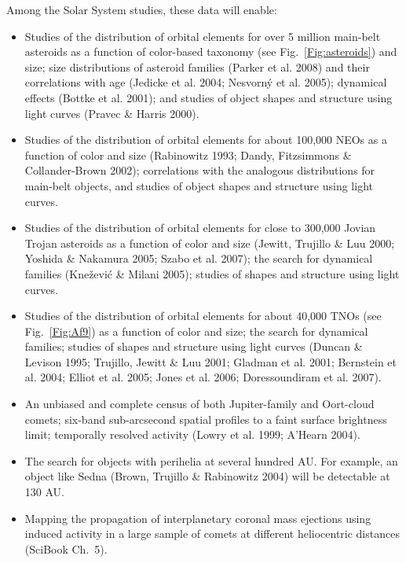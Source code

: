 \documentclass{emulateapj}
\begin{document}
Among the Solar System studies, these data will enable: 
\begin{itemize}
\item Studies of the distribution of orbital elements for over 5 million main-belt 
asteroids as a function of color-based taxonomy (see Fig.~\ref{Fig:asteroids})
and size; size distributions of asteroid families (Parker et al. 2008) and their
correlations with age (Jedicke et al. 2004; Nesvorn\'{y} et al. 2005); dynamical 
effects (Bottke et al. 2001); and studies of object shapes and structure using 
light curves (Pravec \& Harris 2000). 
\item Studies of the distribution of orbital elements for about 100,000 NEOs as a 
function of color and size (Rabinowitz 1993; Dandy, Fitzsimmons \& Collander-Brown 2002);
correlations with the analogous distributions for 
main-belt objects, and studies of object shapes and structure using light curves. 
\item Studies of the distribution of orbital elements for close to 300,000 Jovian Trojan 
asteroids as a function of color and size (Jewitt, Trujillo \& Luu 2000; Yoshida \& 
Nakamura 2005; Szabo et al. 2007); the search for dynamical families (Kne\v{z}evi\'{c} 
\& Milani 2005); studies of shapes and structure using light curves. 
\item Studies of the distribution of orbital elements for about 40,000 TNOs (see 
Fig.~\ref{Fig:Af9}) as a function of color and size; the search for dynamical families;
studies of shapes and structure using light curves (Duncan \& Levison 1995;
Trujillo, Jewitt \& Luu 2001; Gladman et al. 2001; Bernstein et al. 2004; 
Elliot et al. 2005; Jones et al. 2006; Doressoundiram et al. 2007).
\item An unbiased and complete census of both Jupiter-family and Oort-cloud
comets; six-band sub-arcsecond spatial profiles to a faint surface brightness
limit; temporally resolved activity (Lowry et al. 1999; A'Hearn 2004). 
\item The search for objects with perihelia at several hundred AU. For example,
an object like Sedna (Brown, Trujillo \& Rabinowitz 2004) will be detectable at 130 AU. 
\item Mapping the propagation of interplanetary coronal mass ejections using induced 
 activity in a large sample of comets at different heliocentric distances
(SciBook Ch.~5).
\end{itemize}
\end{document}
